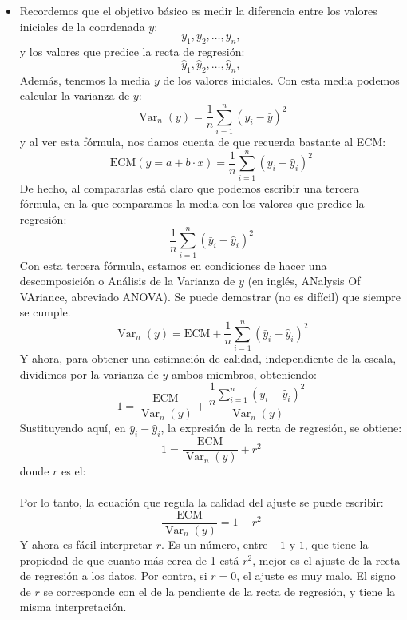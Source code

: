 \begin{itemize}
    \item Recordemos que el objetivo básico es medir la diferencia entre los valores iniciales de la coordenada $y$:
    \[y_1, y_2,\ldots, y_n,\]
    y los valores que predice la recta de regresión:
    \[\hat y_1,\hat y_2,\ldots,\hat y_n,\]
    Además, tenemos la media $\bar y$ de los valores iniciales. Con esta media podemos calcular la varianza de $y$:
    \[{\operatorname{Var}_n}(y)=\dfrac{1}{n}\displaystyle\sum_{i=1}^{n}(y_i-\bar y)^2\]
    y al ver esta fórmula, nos damos cuenta de que recuerda bastante al ECM:
    \[\mbox{ECM}(y=a+b\cdot x)=\dfrac{1}{n}\sum_{i=1}^n(y_i-\hat y_i)^2\]
    De hecho, al compararlas está claro que podemos escribir una tercera fórmula, en la que comparamos la media con los valores que predice la regresión:
    \[\dfrac{1}{n}\sum_{i=1}^n(\bar y_i-\hat y_i)^2\]
    Con esta tercera fórmula, estamos en condiciones de hacer una descomposición o Análisis de la Varianza de $y$ (en inglés, ANalysis Of VAriance, abreviado ANOVA). Se puede demostrar (no es difícil) que siempre se cumple.
    \[{\operatorname{Var}_n}(y)=\mbox{ECM}+\dfrac{1}{n}\sum_{i=1}^n(\bar y_i-\hat y_i)^2\]
    Y ahora, para obtener una estimación de calidad, independiente de la escala, dividimos por la varianza de $y$ ambos miembros, obteniendo:
    \[1=\dfrac{\mbox{ECM}}{{\operatorname{Var}_n}(y)}+\dfrac{\dfrac{1}{n}\sum_{i=1}^n(\bar y_i-\hat y_i)^2}{{\operatorname{Var}_n}(y)}\]
    Sustituyendo aquí, en  $\bar y_i-\hat y_i$, la expresión de la recta de regresión, se obtiene:
    \[1=\dfrac{\mbox{ECM}}{{\operatorname{Var}_n}(y)}+r^2\]
    donde $r$ es el:\\[3mm]
        \\[3mm]

    Por lo tanto, la ecuación que regula la calidad del ajuste se puede escribir:
    \[\dfrac{\mbox{ECM}}{{\operatorname{Var}_n}(y)}=1-r^2\]
    Y ahora es fácil interpretar $r$. Es un número, entre $-1$ y $1$, que tiene la propiedad de que {\sf cuanto más cerca de 1 está $r^2$, mejor es el ajuste de la recta de regresión a los datos. Por contra, si $r=0$, el ajuste es muy malo.} El signo de $r$ se corresponde con el de la pendiente de la recta de regresión, y tiene la misma interpretación.

    \end{itemize}

